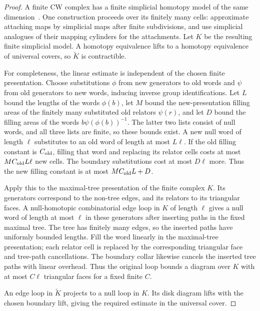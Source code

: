 \begin{proof}
A finite CW complex has a finite simplicial homotopy model of the same dimension~\cite[Theorem~2C.5]{Hatcher2002}. One construction proceeds over its finitely many cells: approximate attaching maps by simplicial maps after finite subdivisions, and use simplicial analogues of their mapping cylinders for the attachments. Let $K$ be the resulting finite simplicial model. A homotopy equivalence lifts to a homotopy equivalence of universal covers, so $\widetilde K$ is contractible.

For completeness, the linear estimate is independent of the chosen finite presentation. Choose substitutions $\phi$ from new generators to old words and $\psi$ from old generators to new words, inducing inverse group identifications. Let $L$ bound the lengths of the words $\phi(b)$, let $M$ bound the new-presentation filling areas of the finitely many substituted old relators $\psi(r)$, and let $D$ bound the filling areas of the words $b\psi(\phi(b))^{-1}$. The latter two lists consist of null words, and all three lists are finite, so these bounds exist. A new null word of length $\ell$ substitutes to an old word of length at most $L\ell$. If the old filling constant is $C_{\rm old}$, filling that word and replacing its relator cells costs at most $MC_{\rm old}L\ell$ new cells. The boundary substitutions cost at most $D\ell$ more. Thus the new filling constant is at most $MC_{\rm old}L+D$.

Apply this to the maximal-tree presentation of the finite complex $K$. Its generators correspond to the non-tree edges, and its relators to its triangular faces. A null-homotopic combinatorial edge loop in $K$ of length $\ell$ gives a null word of length at most $\ell$ in these generators after inserting paths in the fixed maximal tree. The tree has finitely many edges, so the inserted paths have uniformly bounded lengths. Fill the word linearly in the maximal-tree presentation; each relator cell is replaced by the corresponding triangular face and tree-path cancellations. The boundary collar likewise cancels the inserted tree paths with linear overhead. Thus the original loop bounds a diagram over $K$ with at most $C\ell$ triangular faces for a fixed finite $C$.

An edge loop in $\widetilde K$ projects to a null loop in $K$. Its disk diagram lifts with the chosen boundary lift, giving the required estimate in the universal cover.
\end{proof}

